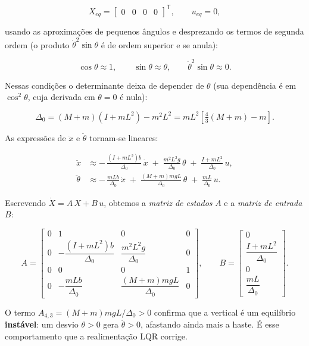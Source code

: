 \documentclass[brazil, 12pt]{article}
\begin{document}
\[
X_{eq} = \begin{bmatrix} 0 & 0 & 0 & 0 \end{bmatrix}^{\mathsf T},
\qquad u_{eq} = 0,
\]

usando as aproximações de pequenos ângulos e desprezando os termos de segunda
ordem (o produto $\dot{\theta}^{2}\sin\theta$ é de ordem superior e se anula):

\[
\cos\theta \approx 1, \qquad \sin\theta \approx \theta, \qquad
\dot{\theta}^{2}\sin\theta \approx 0.
\]

Nessas condições o determinante deixa de depender de $\theta$ (sua dependência é
em $\cos^{2}\theta$, cuja derivada em $\theta=0$ é nula):

\[
\Delta_0 = (M+m)\left(I+mL^{2}\right) - m^{2}L^{2}
= mL^{2}\!\left[\tfrac{4}{3}(M+m) - m\right].
\]

As expressões de $\ddot{x}$ e $\ddot{\theta}$ tornam-se lineares:

\[
\begin{aligned}
\ddot{x} &\approx
-\,\frac{\left(I+mL^{2}\right)b}{\Delta_0}\,\dot{x}
\;+\; \frac{m^{2}L^{2}g}{\Delta_0}\,\theta
\;+\; \frac{I+mL^{2}}{\Delta_0}\,u, \\[8pt]
\ddot{\theta} &\approx
-\,\frac{mLb}{\Delta_0}\,\dot{x}
\;+\; \frac{(M+m)mgL}{\Delta_0}\,\theta
\;+\; \frac{mL}{\Delta_0}\,u.
\end{aligned}
\]

Escrevendo $\dot{X} = A\,X + B\,u$, obtemos a \emph{matriz de estados} $A$ e a
\emph{matriz de entrada} $B$:

\[
A =
\begin{bmatrix}
0 & 1 & 0 & 0 \\[4pt]
0 & -\dfrac{\left(I+mL^{2}\right)b}{\Delta_0} & \dfrac{m^{2}L^{2}g}{\Delta_0} & 0 \\[10pt]
0 & 0 & 0 & 1 \\[4pt]
0 & -\dfrac{mLb}{\Delta_0} & \dfrac{(M+m)mgL}{\Delta_0} & 0
\end{bmatrix},
\qquad
B =
\begin{bmatrix}
0 \\[4pt] \dfrac{I+mL^{2}}{\Delta_0} \\[10pt] 0 \\[4pt] \dfrac{mL}{\Delta_0}
\end{bmatrix}.
\]

O termo $A_{4,3} = (M+m)mgL/\Delta_0 > 0$ confirma que a vertical é um equilíbrio
\textbf{instável}: um desvio $\theta>0$ gera $\ddot{\theta}>0$, afastando ainda
mais a haste. É esse comportamento que a realimentação LQR corrige.
\end{document}
